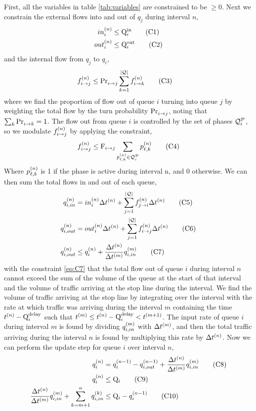 First, all the variables in table \ref{tab:variables} are constrained to be $\ge 0$.
Next we constrain the external flows into and out of $q_j$ during interval $n$,
\begin{align}
\inq{i} &\le \QIN{i} \tag{C1}\label{eq:C1}\\        
\outq{i} &\le \QOUT{i} \tag{C2}\label{eq:C2}
\end{align}
and the internal flow from $q_j$ to $q_i$,
\begin{align}
\f{i}{j} &\le \FTURN{i}{j} \sum \limits_{k=1}^{\Qn}  \f{i}{k} \tag{C3}\label{eq:C3}
\end{align}
where we find the proportion of flow out of queue $i$ turning into queue $j$ by weighting the total flow by the turn probability $\FTURN{i}{j}$, noting that $\sum_k \FTURN{i}{k}=1$. The flow out from queue $i$ is controlled by the set of phases $\QPset{i}$, so we modulate $\f{i}{j}$ by applying the constraint,
\begin{align}
\f{i}{j} \le \FMAX{i}{j} \sum \limits_{\p{\ell}{k} \in \QPset{i}} {\p{\ell}{k}} \tag{C4}\label{eq:C4}
\end{align}
Where $\p{\ell}{k}$ is 1 if the phase is active during interval n, and 0 otherwise. We can then sum the total flows in and out of each queue,
\begin{align}
\qin{i} &= \inq{i} \DT + \sum \limits_{j=1}^{\Qn}  \f{j}{i} \DT   \tag{C5}\label{eq:C5} \\
\qout{i} &= \outq{i} \DT + \sum \limits_{j=1}^{\Qn}  \f{i}{j} \DT \tag{C6}\label{eq:C6}\\
\qout{i} &\le \q{i} + \frac{\DT[n]}{\DT[m]}\qin[m]{i}\tag{C7}\label{eq:C7}
\end{align}
with the constraint \ref{eq:C7} that the total flow out of queue $i$ during interval $n$ cannot exceed the sum of the volume of the queue at the start of that interval and the volume of traffic arriving at the stop line during the interval. We find the volume of traffic arriving at the stop line by integrating over the interval with the rate at which traffic was arriving during the interval $m$ containing the time $\tn - \QDELAY{i}$ such that $\tn[m] \le \tn-\QDELAY{i} < \tn[m+1]$. The input rate of queue $i$ during interval $m$ is found by dividing $\qin[m]{i}$ with $\DT[m]$, and then the total traffic arriving during the interval $n$ is found by multiplying this rate by $\DT$.
Now we can perform the update step for queue $i$ over interval $n$,
\begin{align}
\q{i} &= \q[n-1]{i} - \qout[n-1]{i} + \frac{\DT[n]}{\DT[m]}\qin[m]{i} \tag{C8}\label{eq:C8}\\
\q{i} &\le \QMAX{i} \tag{C9}\label{eq:C9}\\
 \frac{\DT[n]}{\DT[m]}\qin[m]{i}  + \sum \limits_{k=m+1}^n \qin[k]{i} &\le \QMAX{i} - \q[n-1]{i}\tag{C10}\label{eq:C10}
\end{align}

